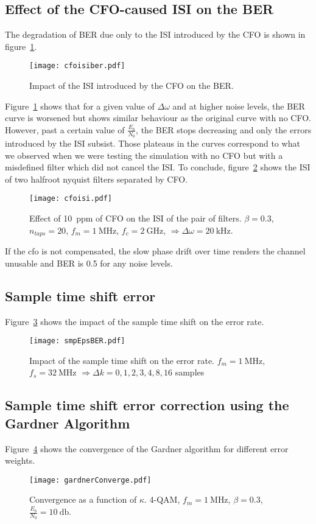 \subsection{Effect of the CFO-caused ISI on the BER}
The degradation of BER due only to the ISI introduced by the CFO is shown in figure~\ref{fig:cfoisiber}.
\begin{figure}[htbp]
\centering
\texttt{[image: cfoisiber.pdf]}
\caption{Impact of the ISI introduced by the CFO on the BER.\label{fig:cfoisiber}}
\end{figure}
Figure~\ref{fig:cfoisiber} shows that for a given value of $\Delta\omega$ and at higher noise levels, the BER curve is worsened but shows similar behaviour as the original curve with no CFO.
However, past a certain value of $\frac{E_b}{N_0}$, the BER stops decreasing and only the errors introduced by the ISI subsist.
Those plateaus in the curves correspond to what we observed when we were testing the simulation with no CFO but with a misdefined filter which did not cancel the ISI.
To conclude, figure~\ref{fig:cfoisi} shows the ISI of two halfroot nyquist filters separated by CFO.
\begin{figure}[htbp]
    \centering
    \texttt{[image: cfoisi.pdf]}
    \caption{Effect of \SI{10}{ppm} of CFO on the ISI of the pair of filters. $\beta = 0.3$, $n_{taps} = 20$, $f_m = \SI{1}{\mega\hertz}$, $f_c = \SI{2}{\giga\hertz}$, $\Rightarrow \Delta\omega = \SI{20}{\kilo\hertz}$.\label{fig:cfoisi}}
\end{figure}

If the cfo is not compensated, the slow phase drift over time renders the channel unusable and BER is 0.5 for any noise levels.

\subsection{Sample time shift error}
Figure~\ref{fig:smpEpsBER} shows the impact of the sample time shift on the error rate.
\begin{figure}[htbp]
\centering
\texttt{[image: smpEpsBER.pdf]}
\caption{Impact of the sample time shift on the error rate. $f_m = \SI{1}{\mega\hertz}$, $f_s = \SI{32}{\mega\hertz}$ $\Rightarrow \Delta k = 0, 1, 2, 3, 4, 8, 16$ samples\label{fig:smpEpsBER}}
\end{figure}

\subsection{Sample time shift error correction using the Gardner Algorithm}
Figure~\ref{fig:gConvK} shows the convergence of the Gardner algorithm for different error weights.
\begin{figure}[htbp]
    \centering
    \texttt{[image: gardnerConverge.pdf]}
    \caption{Convergence as a function of $\kappa$. 4-QAM, $f_m = \SI{1}{\mega\hertz}$, $\beta = 0.3$, $\frac{E_b}{N_0} = \SI{10}{\decibel}$.\label{fig:gConvK}}
\end{figure}

